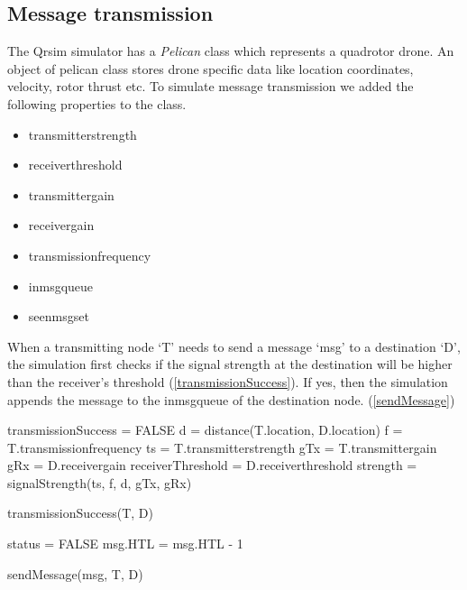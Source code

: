 \subsection{Message transmission}

The Qrsim simulator has a \emph{Pelican} class which represents a quadrotor drone. An object of pelican class stores drone specific data like location coordinates, velocity, rotor thrust etc. To simulate message transmission we added the following properties to the class.
\begin{itemize}
\item transmitter\textunderscore strength
\item receiver\textunderscore threshold
\item transmitter\textunderscore gain
\item receiver\textunderscore gain
\item transmission\textunderscore frequency
\item in\textunderscore msg\textunderscore queue
\item seen\textunderscore msg\textunderscore set
\end{itemize}

When a transmitting node `T' needs to send a message `msg' to a destination `D', the simulation first checks if the signal strength at the destination will be higher than the receiver's threshold (\ref{transmissionSuccess}). If yes, then the simulation appends the message to the in\textunderscore msg\textunderscore queue of the destination node. (\ref{sendMessage})

\begin{algorithm}
\SetAlgoLined
\DontPrintSemicolon
{}
transmissionSuccess = FALSE\;
d = distance(T.location, D.location)\;
f = T.transmission\textunderscore frequency\;
ts = T.transmitter\textunderscore strength\;
gTx = T.transmitter\textunderscore gain\;
gRx = D.receiver\textunderscore gain\;
receiverThreshold = D.receiver\textunderscore threshold\;
strength = signalStrength(ts, f, d, gTx, gRx)\;

\caption{transmissionSuccess(T, D)} \label{transmissionSuccess}
\end{algorithm}

\begin{algorithm}
\DontPrintSemicolon
status = FALSE\;
msg.HTL = msg.HTL - 1\;

\caption{sendMessage(msg, T, D)} \label{sendMessage}
\end{algorithm}


